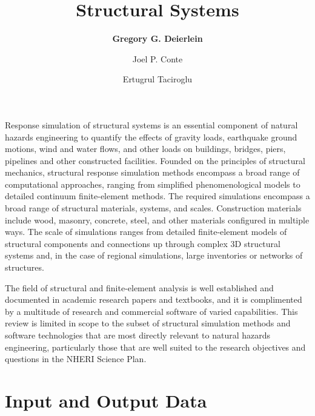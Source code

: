 %
%
%


\title{Structural Systems}
\author{
    \textbf{Gregory G. Deierlein} 
    \and Joel P. Conte
    \and Ertugrul Taciroglu}
\tocauthor{}
%
%
\maketitle
\label{chapter:res_struct}

Response simulation of structural systems is an essential component of natural hazards engineering to quantify the effects of gravity loads, earthquake ground motions, wind and water flows, and other loads on buildings, bridges, piers, pipelines and other constructed facilities. Founded on the principles of structural mechanics, structural response simulation methods encompass a broad range of computational approaches, ranging from simplified phenomenological models to detailed continuum finite-element methods. The required simulations encompass a broad range of structural materials, systems, and scales. Construction materials include wood, masonry, concrete, steel, and other materials configured in multiple ways. The scale of simulations ranges from detailed finite-element models of structural components and connections up through complex 3D structural systems and, in the case of regional simulations, large inventories or networks of structures.

The field of structural and finite-element analysis is well established and documented in academic research papers and textbooks, and it is complimented by a multitude of research and commercial software of varied capabilities. This review is limited in scope to the subset of structural simulation methods and software technologies that are most directly relevant to natural hazards engineering, particularly those that are well suited to the research objectives and questions in the NHERI Science Plan. 

\section{Input and Output Data}
\label{sec:resp_struct_io}

